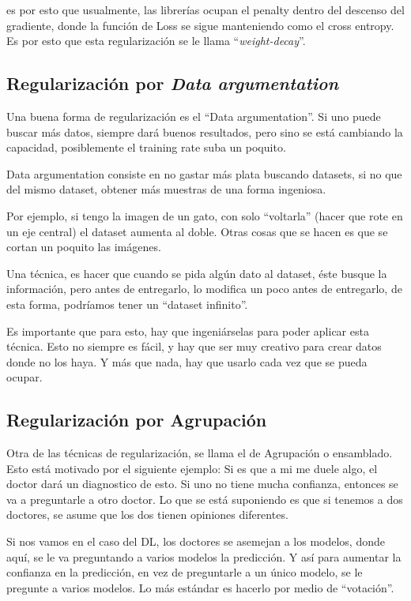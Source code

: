es por esto que usualmente, las librerías ocupan el penalty dentro del descenso del gradiente, donde la función de Loss se sigue manteniendo como el cross entropy. Es por esto que esta regularización se le llama ``\textit{weight-decay}''.

\subsection{Regularización por \textit{Data argumentation}}

Una buena forma de regularización es el ``Data argumentation''. Si uno puede buscar más datos, siempre dará buenos resultados, pero sino se está cambiando la capacidad, posiblemente el training rate suba un poquito. 

Data argumentation consiste en no gastar más plata buscando datasets, si no que del mismo dataset, obtener más muestras de una forma ingeniosa. 

Por ejemplo, si tengo la imagen de un gato, con solo ``voltarla'' (hacer que rote en un eje central) el dataset aumenta al doble. Otras cosas que se hacen es que se cortan un poquito las imágenes.

Una técnica, es hacer que cuando se pida algún dato al dataset, éste busque la información, pero antes de entregarlo, lo modifica un poco antes de entregarlo, de esta forma, podríamos tener un ``dataset infinito''.

Es importante que para esto, hay que ingeniárselas para poder aplicar esta técnica. Esto no siempre es fácil, y hay que ser muy creativo para crear datos donde no los haya. Y más que nada, hay que usarlo cada vez que se pueda ocupar.

\subsection{Regularización por Agrupación}

Otra de las técnicas de regularización, se llama el de Agrupación o ensamblado. Esto está motivado por el siguiente ejemplo: Si es que a mi me duele algo, el doctor dará un diagnostico de esto. Si uno no tiene mucha confianza, entonces se va a preguntarle a otro doctor. Lo que se está suponiendo es que si tenemos a dos doctores, se asume que los dos tienen opiniones diferentes.

Si nos vamos en el caso del DL, los doctores se asemejan a los modelos, donde aquí, se le va preguntando a varios modelos la predicción. Y así para aumentar la confianza en la predicción, en vez de preguntarle a un único modelo, se le pregunte a varios modelos. Lo más estándar es hacerlo por medio de ``votación''.

